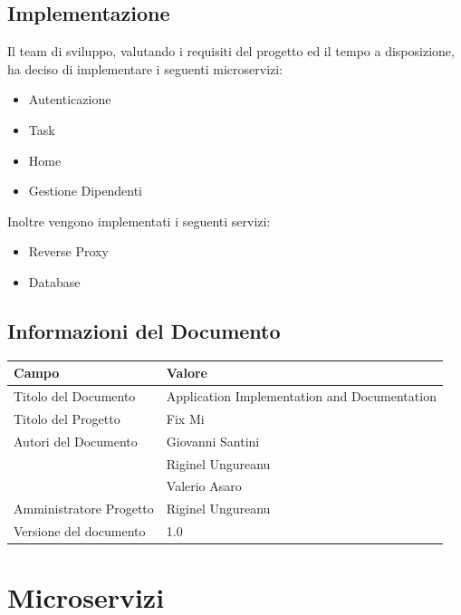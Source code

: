 \documentclass{report}
\begin{document}
\section{Implementazione}
Il team di sviluppo, valutando i requisiti del progetto ed il tempo a disposizione, ha deciso di implementare i seguenti microservizi:
\begin{itemize}
	\item Autenticazione
	\item Task
	\item Home
	\item Gestione Dipendenti
\end{itemize}
Inoltre vengono implementati i seguenti servizi:
\begin{itemize}
	\item Reverse Proxy
	\item Database
\end{itemize}


\section{Informazioni del Documento}

\begin{center} %
	\centering
	\begin{tabular}{ |p{4cm}|p{4cm}|  }
		\hline
		\centering Campo        & \qquad\qquad Valore                          \\ %
		\hline
		Titolo del Documento    & Application Implementation and Documentation \\
		\hline
		Titolo del Progetto     & Fix Mi                                       \\
		\hline
		Autori del Documento    &
		Giovanni Santini                                                       \\ & Riginel Ungureanu \\ & Valerio Asaro \\
		\hline
		Amministratore Progetto & Riginel Ungureanu                            \\
		\hline
		Versione del documento  & 1.0                                          \\
		\hline
	\end{tabular}
\end{center}



\chapter{Microservizi}
\end{document}
